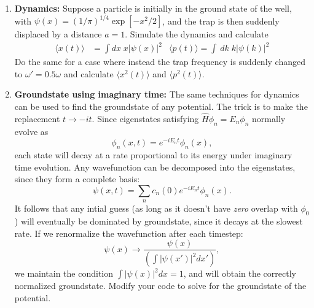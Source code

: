 \documentclass[11pt]{article}
\begin{document}
\begin{enumerate}
\item \textbf {Dynamics:} Suppose a particle is initially in the ground state of the well, with $\psi(x) = (1/\pi)^{1/4}\exp{[-x^2/2]}$, and the trap is then suddenly displaced by a distance $a=1$. Simulate the dynamics and calculate
\begin{align}
\langle x(t) \rangle &= \int dx\; x |\psi(x)|^2  & \langle p(t) \rangle = \int  \ dk\; k |\psi(k)|^2
\end{align}
Do the same for a case where instead the trap frequency is suddenly changed to $\omega' = 0.5 \omega$ and calculate $\langle x^2(t) \rangle$ and $\langle p^2(t) \rangle $.
 \item \textbf {Groundstate using imaginary time:} The same techniques for dynamics can be used to find the groundstate of any potential. The trick is to make the replacement 
$ t \rightarrow -i t$. Since eigenstates satisfying $ \hat H \phi_n = E_n \phi_n$ normally evolve as
 \begin{equation}
 \phi_n(x,t) = e^{-i E_n t }\phi_n(x),
  \end{equation} 
each state will decay at a rate proportional to its energy under imaginary time evolution.  Any wavefunction can be decomposed into the eigenstates, since they form a complete basis:
\begin{equation}
\psi(x,t) = \sum_n c_n(0) e^{-i E_n t} \phi_n(x).
\end{equation}
It follows that any intial guess (as long as it doesn't have  \emph{zero} overlap with $\phi_0$) will eventually be dominated by groundstate, since it decays at the slowest rate. If we renormalize the wavefunction after each timestep: 
\begin{equation}
\psi(x) \rightarrow \frac{\psi(x)}{  \left( \textstyle{\int{|\psi(x')|^2} dx'} \right) },
\end{equation}
 we maintain the condition $\int |\psi(x)|^2 dx =1$, and will obtain the correctly normalized groundstate. Modify your code to solve for the groundstate of the potential.


\end{enumerate}
\end{document}

